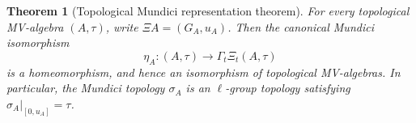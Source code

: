 \documentclass[preprint,3p]{elsarticle}
\theoremstyle{plain}
\newtheorem{thm}{Theorem}[section]
\theoremstyle{definition}
\newcommand{\TopMV}{\mathbf{TopMV}}
\numberwithin{equation}{section}
\begin{document}



\begin{thm}[Topological Mundici representation theorem]
\label{thm-topological-representation}
\label{thm-intro-representation}
For every topological MV-algebra $(A,\tau)$, write $\Xi A=(G_A,u_A)$.
Then the canonical Mundici isomorphism
\[
 \eta_A\colon(A,\tau)\longrightarrow
 \Gamma_t\Xi_t(A,\tau)
\]
is a homeomorphism, and hence an isomorphism of topological
MV-algebras.  In particular, the Mundici topology $\sigma_A$ is an
$\ell$-group topology satisfying $\sigma_A|_{[0,u_A]}=\tau$.
\end{thm}
\end{document}
